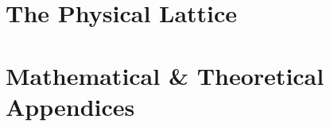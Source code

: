 \documentclass[12pt,oneside]{book}
\begin{document}
\part{The Physical Lattice}














\part{Mathematical \& Theoretical Appendices}






\appendix


\end{document}
